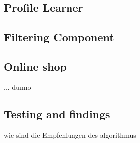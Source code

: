 \subsection{Profile Learner}

\subsection{Filtering Component}



\subsection{Online shop}
... dunno

\subsection{Testing and findings}
wie sind die Empfehlungen des algorithmus








